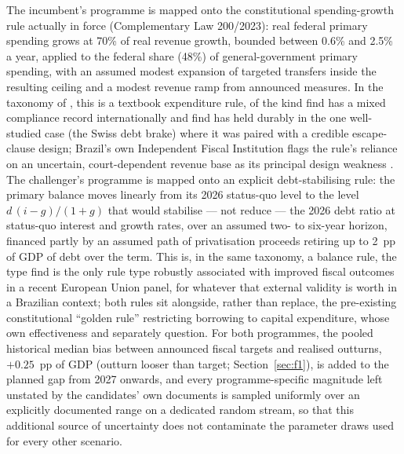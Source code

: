 \documentclass[11pt,a4paper]{article}
\begin{document}
The incumbent's programme is mapped onto the constitutional spending-growth rule actually in force (Complementary Law 200/2023): real federal primary spending grows at 70\% of real revenue growth, bounded between 0.6\% and 2.5\% a year, applied to the federal share (48\%) of general-government primary spending, with an assumed modest expansion of targeted transfers inside the resulting ceiling and a modest revenue ramp from announced measures. In the taxonomy of \citet{kopitssymansky1998}, this is a textbook expenditure rule, of the kind \citet{cordesetal2015} find has a mixed compliance record internationally and \citet{feldkirchgassner2008} find has held durably in the one well-studied case (the Swiss debt brake) where it was paired with a credible escape-clause design; Brazil's own Independent Fiscal Institution flags the rule's reliance on an uncertain, court-dependent revenue base as its principal design weakness \citep{ifi2023raf76}. The challenger's programme is mapped onto an explicit debt-stabilising rule: the primary balance moves linearly from its 2026 status-quo level to the level $d\,(i-g)/(1+g)$ that would stabilise --- not reduce --- the 2026 debt ratio at status-quo interest and growth rates, over an assumed two- to six-year horizon, financed partly by an assumed path of privatisation proceeds retiring up to 2~pp of GDP of debt over the term. This is, in the same taxonomy, a balance rule, the type \citet{lopezvillavicencio2025} find is the only rule type robustly associated with improved fiscal outcomes in a recent European Union panel, for whatever that external validity is worth in a Brazilian context; both rules sit alongside, rather than replace, the pre-existing constitutional ``golden rule'' restricting borrowing to capital expenditure, whose own effectiveness \citet{pires2019reggraouro} and \citet{nunesetal2020} separately question. For both programmes, the pooled historical median bias between announced fiscal targets and realised outturns, $+0.25$~pp of GDP (outturn looser than target; Section~\ref{sec:f1}), is added to the planned gap from 2027 onwards, and every programme-specific magnitude left unstated by the candidates' own documents is sampled uniformly over an explicitly documented range on a dedicated random stream, so that this additional source of uncertainty does not contaminate the parameter draws used for every other scenario.
\end{document}
